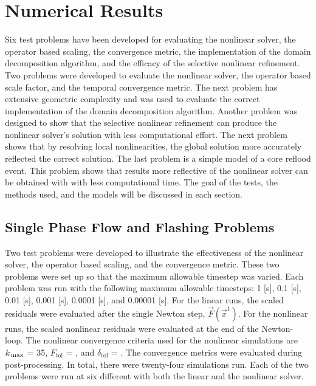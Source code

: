 \chapter{Numerical Results}
\label{chap:results}

Six test problems have been developed for evaluating the nonlinear solver, the operator based scaling, the convergence metric, the implementation of the domain decomposition algorithm, and the efficacy of the selective nonlinear refinement.
Two problems were developed to evaluate the nonlinear solver, the operator based scale factor, and the temporal convergence metric.
The next problem has extensive geometric complexity and was used to evaluate the correct implementation of the domain decomposition algorithm.
Another problem was designed to show that the selective nonlinear refinement can produce the nonlinear solver's solution with less computational effort.
The next problem shows that by resolving local nonlinearities, the global solution more accurately reflected the correct solution.
The last problem is a simple model of a core reflood event.
This problem shows that results more reflective of the nonlinear solver can be obtained with with less computational time.
The goal of the tests, the methods used, and the models will be discussed in each section.

\section{Single Phase Flow and Flashing Problems}
\label{sect:single_phase_and_flashing}

Two test problems were developed to illustrate the effectiveness of the nonlinear solver, the operator based scaling, and the convergence metric.
These two problems were set up so that the maximum allowable timestep was varied.
Each problem was run with the following maximum allowable timesteps: 1 [s], 0.1 [s], 0.01 [s], 0.001 [s], 0.0001 [s], and 0.00001 [s]. 
For the linear runs, the scaled residuals were evaluated after the single Newton step, $\vec{F}(\vec{x}^{1})$.
For the nonlinear runs, the scaled nonlinear residuals were evaluated at the end of the Newton-loop.
The nonlinear convergence criteria used for the nonlinear simulations are $\kmax$ = 35, $F_{\text{tol}}$ = , and $\delta_{\text{tol}}$ = .
The convergence metrics were evaluated during post-processing.
In total, there were twenty-four simulations run.
Each of the two problems were run at six different \dtmax{} with both the linear and the nonlinear solver.

